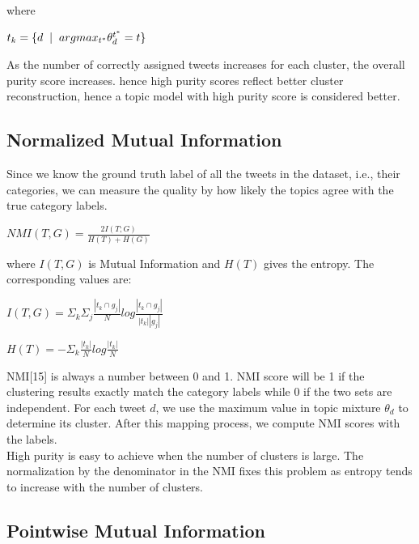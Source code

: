 \documentclass[10pt,a5paper,twoside]{article}
\begin{document}
where

\begin{center}
$ t_k = \lbrace  d \hspace{2 mm} |  \hspace{2 mm} argmax_{t^*} \theta^{t^{*}}_d = t \rbrace $
\end{center}

As the number of correctly assigned tweets increases for each cluster, the overall purity score increases. hence high purity scores reflect better cluster reconstruction, hence a topic model with high purity score is considered better.
\\

\subsection{Normalized Mutual Information}
Since we know the ground truth label of all the tweets in the dataset, i.e., their categories, we can measure the quality by how likely the topics agree with the true category labels. 
\begin{center}
$NMI(T,G) = \frac{2 I(T;G)}{H(T) + H(G)} $
\end{center}
where $I(T,G)$ is Mutual Information and $H(T)$ gives the entropy. The 
corresponding values are:

\begin{center}
$ I(T,G) = \Sigma_{k} \Sigma_{j} \frac{|t_{k} \cap g_{j}|}{N} log \frac{|t_{k} \cap g_{j}|}{|t_{k}| |g_{j}|} $
\end{center}

\begin{center}
$ H(T) = - \Sigma_k \frac{|t_k|}{N} log \frac{|t_k|}{N} $
\end{center}

NMI[15] is always a number between 0 and 1. NMI score will be 1 if the clustering results exactly match the category labels while 0 if the two sets are independent. For each tweet $d$, we use the maximum value in topic mixture $ \theta_{d} $ to determine its cluster. After this mapping process, we compute NMI scores with the labels.
\\
High purity is easy to achieve when the number of clusters is large. The normalization by the denominator in the NMI fixes this problem as entropy tends to increase with the number of clusters.

\subsection{Pointwise Mutual Information}
\end{document}
